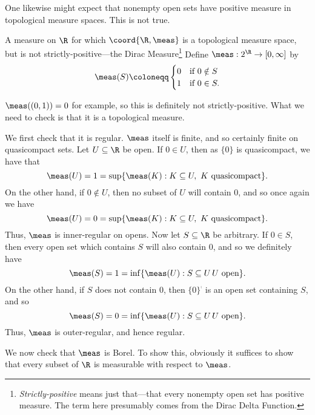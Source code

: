 One likewise might expect that nonempty open sets have positive measure in topological measure spaces.  This is not true.
\begin{exm}{A measure on $\R$ for which $\coord{\R ,\meas}$ is a topological measure space, but is not strictly-positive---the Dirac Measure}{}\footnote{\emph{Strictly-positive} means just that---that every nonempty open set has positive measure.  The term here presumably comes from the Dirac Delta Function.}
Define $\meas :2^{\R}\rightarrow [0,\infty ]$ by
\begin{equation}
\meas (S)\coloneqq \begin{cases}0 & \text{if }0\notin S \\ 1 & \text{if }0\in S.\end{cases}
\end{equation}

$\meas ((0,1))=0$ for example, so this is definitely not strictly-positive.  What we need to check is that it is a topological measure.

We first check that it is regular.  $\meas$ itself is finite, and so certainly finite on quasicompact sets.  Let $U\subseteq \R$ be open.  If $0\in U$, then as $\{ 0\}$ is quasicompact, we have that
\begin{equation}
\meas (U)=1=\sup \{ \meas (K):K\subseteq U,\ K\text{ quasicompact}\} .
\end{equation}
On the other hand, if $0\notin U$, then no subset of $U$ will contain $0$, and so once again we have
\begin{equation}
\meas (U)=0=\sup \{ \meas (K):K\subseteq U,\ K\text{ quasicompact}\} .
\end{equation}
Thus, $\meas$ is inner-regular on opens.  Now let $S\subseteq \R$ be arbitrary.  If $0\in S$, then every open set which contains $S$ will also contain $0$, and so we definitely have
\begin{equation}
\meas (S)=1=\inf \{ \meas (U):S\subseteq U\, U\text{ open}\} .
\end{equation}
On the other hand, if $S$ does not contain $0$, then $\{ 0\} ^{\comp}$ is an open set containing $S$, and so
\begin{equation}
\meas (S)=0=\inf \{ \meas (U):S\subseteq U\, U\text{ open}\} .
\end{equation}
Thus, $\meas$ is outer-regular, and hence regular.

We now check that $\meas$ is Borel.  To show this, obviously it suffices to show that every subset of $\R$ is measurable with respect to $\meas$.


\end{exm}
